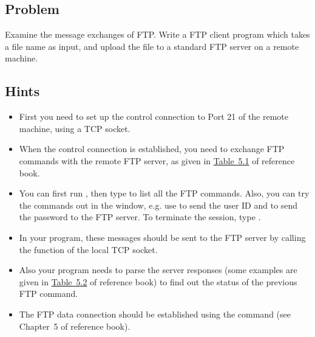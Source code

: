 \documentclass{../UTNetLab}
\begin{document}
\subsection*{Problem}
Examine the message exchanges of FTP.
Write a FTP client program which takes a file name as input, and upload the file to a standard FTP server on a remote machine.

\subsection*{Hints}
\begin{itemize}
    \item First you need to set up the control connection to Port 21 of the remote machine, using a TCP socket.
    \item When the control connection is established, you need to exchange FTP commands with the remote FTP server, as given in \hyperref[tab:5.1]{Table~5.1} of reference book.
    \item You can first run , then type  to list all the FTP commands.
          Also, you can try the commands out in the  window, e.g. use  to send the user ID and  to send the password to the FTP server.
          To terminate the  session, type .
    \item In your program, these messages should be sent to the FTP server by calling the  function of the local TCP socket.
    \item Also your program needs to parse the server responses (some examples are given in \hyperref[tab:5.2]{Table~5.2} of reference book) to find out the status of the previous FTP command.
    \item The FTP data connection should be established using the  command (see Chapter~5 of reference book).
\end{itemize}
\end{document}
